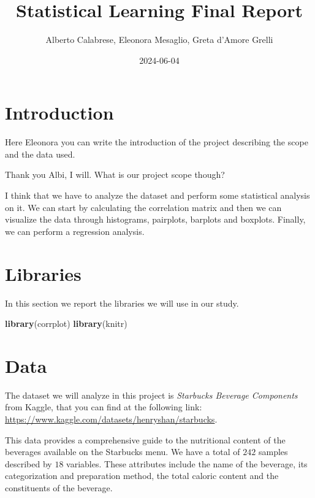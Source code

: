 \documentclass[
]{article}
\title{Statistical Learning Final Report}
\author{Alberto Calabrese, Eleonora Mesaglio, Greta d'Amore Grelli}
\date{2024-06-04}
\newenvironment{Shaded}{\begin{snugshade}}{\end{snugshade}}
\newcommand{\FunctionTok}[1]{\textcolor[rgb]{0.13,0.29,0.53}{\textbf{#1}}}
\newcommand{\NormalTok}[1]{#1}
\begin{document}
\maketitle

{
\setcounter{tocdepth}{3}
\tableofcontents
}
\section{Introduction}\label{introduction}

Here Eleonora you can write the introduction of the project describing
the scope and the data used.

Thank you Albi, I will. What is our project scope though?

I think that we have to analyze the dataset and perform some statistical
analysis on it. We can start by calculating the correlation matrix and
then we can visualize the data through histograms, pairplots, barplots
and boxplots. Finally, we can perform a regression analysis.

\section{Libraries}\label{libraries}

In this section we report the libraries we will use in our study.

\begin{Shaded}
\begin{Highlighting}[]
\FunctionTok{library}\NormalTok{(corrplot)}
\FunctionTok{library}\NormalTok{(knitr)}
\end{Highlighting}
\end{Shaded}

\section{Data}\label{data}

The dataset we will analyze in this project is \emph{Starbucks Beverage
Components} from Kaggle, that you can find at the following link:
\url{https://www.kaggle.com/datasets/henryshan/starbucks}.

This data provides a comprehensive guide to the nutritional content of
the beverages available on the Starbucks menu. We have a total of
\(242\) samples described by \(18\) variables. These attributes include
the name of the beverage, its categorization and preparation method, the
total caloric content and the constituents of the beverage.
\end{document}
